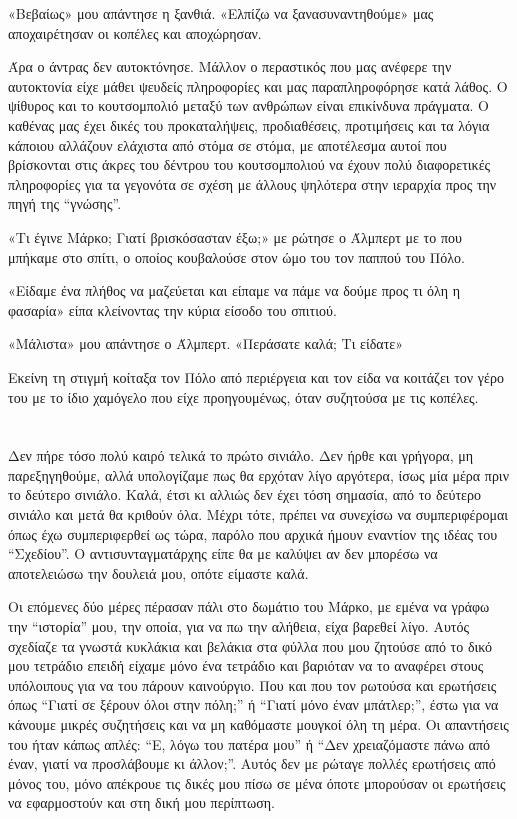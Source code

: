 \documentclass[12pt,twoside, openany]{book}
\begin{document}
«Βεβαίως» μου απάντησε η ξανθιά. «Ελπίζω να ξανασυναντηθούμε» μας αποχαιρέτησαν οι κοπέλες και αποχώρησαν.

Άρα ο άντρας δεν αυτοκτόνησε. Μάλλον ο περαστικός που μας ανέφερε την αυτοκτονία είχε μάθει ψευδείς πληροφορίες και μας παραπληροφόρησε κατά λάθος. Ο ψίθυρος και το κουτσομπολιό μεταξύ των ανθρώπων είναι επικίνδυνα πράγματα. Ο καθένας μας έχει δικές του προκαταλήψεις, προδιαθέσεις, προτιμήσεις και τα λόγια κάποιου αλλάζουν ελάχιστα από στόμα σε στόμα, με αποτέλεσμα αυτοί που βρίσκονται στις άκρες του δέντρου του κουτσομπολιού να έχουν πολύ διαφορετικές πληροφορίες για τα γεγονότα σε σχέση με άλλους ψηλότερα στην ιεραρχία προς την πηγή της “γνώσης”.

«Τι έγινε Μάρκο; Γιατί βρισκόσασταν έξω;» με ρώτησε ο Άλμπερτ με το που μπήκαμε στο σπίτι, ο οποίος κουβαλούσε στον ώμο του τον παππού του Πόλο.

«Είδαμε ένα πλήθος να μαζεύεται και είπαμε να πάμε να δούμε προς τι όλη η φασαρία» είπα κλείνοντας την κύρια είσοδο του σπιτιού.

«Μάλιστα» μου απάντησε ο Άλμπερτ. «Περάσατε καλά; Τι είδατε»

Εκείνη τη στιγμή κοίταξα τον Πόλο από περιέργεια και τον είδα να κοιτάζει τον γέρο του με το ίδιο χαμόγελο που είχε προηγουμένως, όταν συζητούσα με τις κοπέλες.


\chapter{}

Δεν πήρε τόσο πολύ καιρό τελικά το πρώτο σινιάλο. Δεν ήρθε και γρήγορα, μη παρεξηγηθούμε, αλλά υπολογίζαμε πως θα ερχόταν λίγο αργότερα, ίσως μία μέρα πριν το δεύτερο σινιάλο. Καλά, έτσι κι αλλιώς δεν έχει τόση σημασία, από το δεύτερο σινιάλο και μετά θα κριθούν όλα. Μέχρι τότε, πρέπει να συνεχίσω να συμπεριφέρομαι όπως έχω συμπεριφερθεί ως τώρα, παρόλο που αρχικά ήμουν εναντίον της ιδέας του “Σχεδίου”. Ο αντισυνταγματάρχης είπε θα με καλύψει αν δεν μπορέσω να αποτελειώσω την δουλειά μου, οπότε είμαστε καλά.

Οι επόμενες δύο μέρες πέρασαν πάλι στο δωμάτιο του Μάρκο, με εμένα να γράφω την “ιστορία” μου, την οποία, για να πω την αλήθεια, είχα βαρεθεί λίγο. Αυτός σχεδίαζε τα γνωστά κυκλάκια και βελάκια στα φύλλα που μου ζητούσε από το δικό μου τετράδιο επειδή είχαμε μόνο ένα τετράδιο και βαριόταν να το αναφέρει στους υπόλοιπους για να του πάρουν καινούργιο. Που και που τον ρωτούσα και ερωτήσεις όπως “Γιατί σε ξέρουν όλοι στην πόλη;” ή “Γιατί μόνο έναν μπάτλερ;”, έστω για να κάνουμε μικρές συζητήσεις και να μη καθόμαστε μουγκοί όλη τη μέρα. Οι απαντήσεις του ήταν κάπως απλές: “Ε, λόγω του πατέρα μου” ή “Δεν χρειαζόμαστε πάνω από έναν, γιατί να προσλάβουμε κι άλλον;”. Αυτός δεν με ρώταγε πολλές ερωτήσεις από μόνος του, μόνο απέκρουε τις δικές μου πίσω σε μένα όποτε μπορούσαν οι ερωτήσεις να εφαρμοστούν και στη δική μου περίπτωση. 
\end{document}
